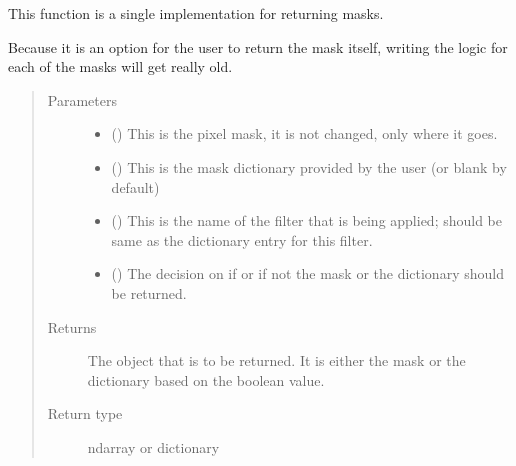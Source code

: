 \documentclass[letterpaper,10pt,english]{sphinxmanual}
\begin{document}
\begin{fulllineitems}
\label{\detokenize{python_docstrings/IfA_Smeargle.echo.echo_functions:IfA_Smeargle.echo.echo_functions.functioned_mask_returning}}
This function is a single implementation for returning masks.

Because it is an option for the user to return the mask itself, writing the logic for each
of the masks will get really old.
\begin{quote}\begin{description}
\item[{Parameters}] \leavevmode\begin{itemize}
\item {} 
 () \textendash{} This is the pixel mask, it is not changed, only where it goes.

\item {} 
 () \textendash{} This is the mask dictionary provided by the user (or blank by default)

\item {} 
 () \textendash{} This is the name of the filter that is being applied; should be same as the dictionary
entry for this filter.

\item {} 
 () \textendash{} The decision on if or if not the mask or the dictionary should be returned.

\end{itemize}

\item[{Returns}] \leavevmode
{} \textendash{} The object that is to be returned. It is either the mask or the dictionary based on
the boolean value.

\item[{Return type}] \leavevmode
ndarray or dictionary

\end{description}\end{quote}

\end{fulllineitems}
\end{document}
